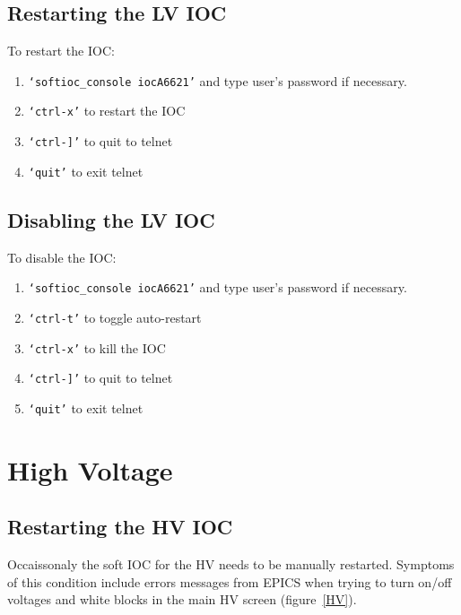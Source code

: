 \documentclass[12pt]{article}
\begin{document}
\subsection{Restarting the LV IOC}
   To restart the IOC:
   {\footnotesize
   \begin{enumerate}
       \item \texttt{`softioc\_console iocA6621'} and type user's password if necessary.
       \item \texttt{`ctrl-x'} to restart the IOC
       \item \texttt{`ctrl-]'} to quit to telnet
       \item \texttt{`quit'} to exit telnet
   \end{enumerate}
   }

\subsection{Disabling the LV IOC}\label{lviocstop}
   To disable the IOC:
   {\footnotesize
   \begin{enumerate}
       \item \texttt{`softioc\_console iocA6621'} and type user's password if necessary.
       \item \texttt{`ctrl-t'} to toggle auto-restart
       \item \texttt{`ctrl-x'} to kill the IOC
       \item \texttt{`ctrl-]'} to quit to telnet
       \item \texttt{`quit'} to exit telnet
   \end{enumerate}
   }

\newpage
{\color{blue}
   \section{High Voltage}
   }
   \subsection{Restarting the HV IOC}
   Occaissonaly the soft IOC for the HV needs to be manually restarted.  Symptoms of this condition include errors messages from EPICS when trying to turn on/off voltages and white blocks in the main HV screen (figure~\ref{HV}).  
   
\end{document}
